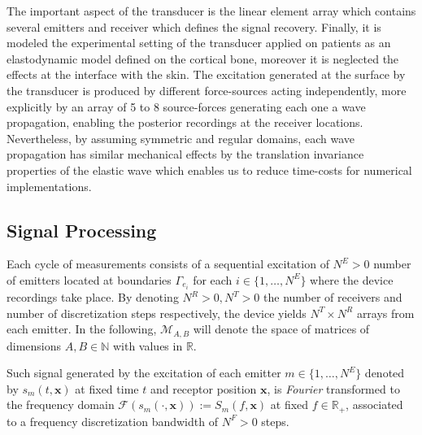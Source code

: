 The important aspect of the transducer is the linear element array which contains several emitters and receiver which defines the signal recovery. Finally, it is modeled the experimental setting of the transducer applied on patients as an elastodynamic model defined on the cortical bone, moreover it is neglected the effects at the interface with the skin. The excitation generated at the surface by the transducer is produced by different force-sources acting independently, more explicitly by an array of 5 to 8 source-forces generating each one a wave propagation, enabling the posterior recordings at the receiver locations. Nevertheless, by assuming symmetric and regular domains, each wave propagation has similar mechanical effects by the translation invariance properties of the elastic wave which enables us to reduce time-costs for numerical implementations. 

\subsection{Signal Processing}
Each cycle of measurements consists of a sequential excitation of $N^E > 0$ number of emitters located at boundaries $\Gamma_{e_i}$ for each $i \in \{1,\dots, N^E\}$ where the device recordings take place. By denoting $N^R>0, N^T>0$ the number of receivers and number of discretization steps respectively, the device yields $N^T \times N^R$ arrays from each emitter. In the following, $\mathcal{M}_{A, B}$ will denote the space of matrices of dimensions $A, B  \in \mathbb{N}$ with values in $\mathbb{R}$.

Such signal generated by the excitation of each emitter $m \in \{1,\dots, N^E\}$ denoted by $s_m(t, \mathbf{x})$ at fixed time $t$ and receptor position $\mathbf{x}$, is \textit{Fourier} transformed to the frequency domain  $\mathcal{F}(s_m(\cdot,\mathbf{x})) := S_m(f, \mathbf{x})$ at fixed $f \in \mathbb{R}_+$, associated to a frequency discretization bandwidth of $N^F > 0$ steps.

